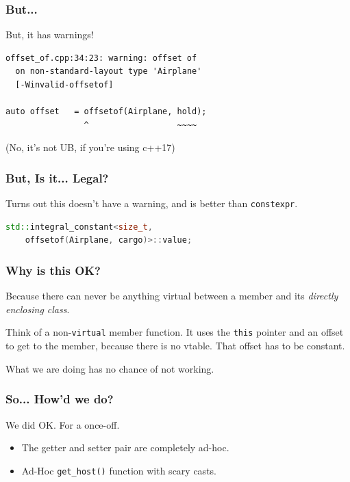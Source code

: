 \documentclass{beamer}
\def\code#1{\texttt{#1}}
\newcommand{\this}{\code{this}\xspace}
\newcommand{\nl}{\vspace{0.2\baselineskip}}
\begin{document}
\begin{frame}[fragile]
\frametitle{But...}
\begin{center}
  But, it has warnings!
\end{center}
\begin{verbatim}
offset_of.cpp:34:23: warning: offset of
  on non-standard-layout type 'Airplane'
  [-Winvalid-offsetof]

auto offset   = offsetof(Airplane, hold);
                ^                  ~~~~
\end{verbatim}
(No, it's not UB, if you're using c++17)
\end{frame}


\begin{frame}[fragile]
\frametitle{But, Is it... Legal?}
\begin{center}
  Turns out this doesn't have a warning, and is better than \code{constexpr}.
\end{center}
\begin{lstlisting}[language=cpp]
  std::integral_constant<size_t,
    offsetof(Airplane, cargo)>::value;
\end{lstlisting}
\end{frame}

\begin{frame}[fragile]
  \frametitle{Why is this OK?}
  Because there can never be anything virtual between a member and its
  \emph{directly enclosing class}.

  Think of a non-\code{virtual} member function. It uses the \this pointer and
  an offset to get to the member, because there is no vtable. That offset has to
  be constant.

  What we are doing has no chance of not working.
\end{frame}


\begin{frame}[fragile]
\frametitle{So... How'd we do?}
\begin{center}
  We did OK. For a once-off.\nl\nl

\begin{itemize}
  \item The getter and setter pair are completely ad-hoc.
  \item Ad-Hoc \code{get\_host()} function with scary casts.
\end{itemize}

\end{center}
\end{frame}
\end{document}
